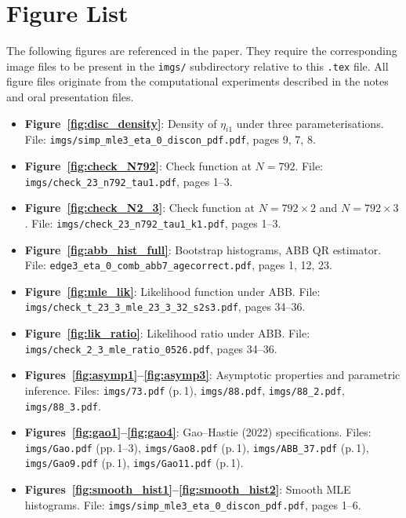 \documentclass[12pt]{article}
\begin{document}
\section{Figure List}
\label{app:figures}

The following figures are referenced in the paper.
They require the corresponding image files to be present in the
\texttt{imgs/} subdirectory relative to this \texttt{.tex} file.
All figure files originate from the computational experiments described in
the notes and oral presentation files.

\begin{itemize}
\item \textbf{Figure~\ref{fig:disc_density}}: Density of $\eta_{i1}$ under
  three parameterisations.
  File: \texttt{imgs/simp\_mle3\_eta\_0\_discon\_pdf.pdf}, pages 9, 7, 8.
\item \textbf{Figure~\ref{fig:check_N792}}: Check function at $N=792$.
  File: \texttt{imgs/check\_23\_n792\_tau1.pdf}, pages 1--3.
\item \textbf{Figure~\ref{fig:check_N2_3}}: Check function at $N=792\times2$
  and $N=792\times3$.
  File: \texttt{imgs/check\_23\_n792\_tau1\_k1.pdf}, pages 1--3.
\item \textbf{Figure~\ref{fig:abb_hist_full}}: Bootstrap histograms, ABB QR
  estimator.
  File: \texttt{edge3\_eta\_0\_comb\_abb7\_agecorrect.pdf},
  pages 1, 12, 23.
\item \textbf{Figure~\ref{fig:mle_lik}}: Likelihood function under ABB.
  File: \texttt{imgs/check\_t\_23\_3\_mle\_23\_3\_32\_s2s3.pdf},
  pages 34--36.
\item \textbf{Figure~\ref{fig:lik_ratio}}: Likelihood ratio under ABB.
  File: \texttt{imgs/check\_2\_3\_mle\_ratio\_0526.pdf}, pages 34--36.
\item \textbf{Figures~\ref{fig:asymp1}--\ref{fig:asymp3}}: Asymptotic
  properties and parametric inference.
  Files: \texttt{imgs/73.pdf} (p.\,1),
  \texttt{imgs/88.pdf}, \texttt{imgs/88\_2.pdf}, \texttt{imgs/88\_3.pdf}.
\item \textbf{Figures~\ref{fig:gao1}--\ref{fig:gao4}}: Gao--Hastie (2022)
  specifications.
  Files: \texttt{imgs/Gao.pdf} (pp.\,1--3),
  \texttt{imgs/Gao8.pdf} (p.\,1),
  \texttt{imgs/ABB\_37.pdf} (p.\,1),
  \texttt{imgs/Gao9.pdf} (p.\,1),
  \texttt{imgs/Gao11.pdf} (p.\,1).
\item \textbf{Figures~\ref{fig:smooth_hist1}--\ref{fig:smooth_hist2}}: Smooth
  MLE histograms.
  File: \texttt{imgs/simp\_mle3\_eta\_0\_discon\_pdf.pdf}, pages 1--6.
\end{itemize}
\end{document}
